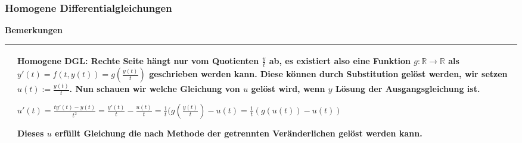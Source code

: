 \subsubsection{Homogene Differentialgleichungen}

    \noindent
    \textbf{Bemerkungen}
    \begin{table}[H]
    \begin{tabularx}{\textwidth}{X m{16cm}}
        \toprule

              & Homogene DGL: Rechte Seite hängt nur vom Quotienten $\frac{y}{t}$ ab, es existiert also eine Funktion $g: \mathbb{R} \rightarrow \mathbb{R}$
                als $y'(t) = f(t,y(t)) = g(\frac{y(t)}{t})$ geschrieben werden kann. \hfill \break
                Diese können durch Substitution gelöst werden, wir setzen $u(t) := \frac{y(t)}{t}$. \hfill \break
                Nun schauen wir welche Gleichung von $u$ gelöst wird, wenn $y$ Lösung der Ausgangsgleichung ist. \hfill \break
                \centerline{$ u'(t) = \frac{ty'(t)-y(t)}{t^2} = \frac{y'(t)}{t} - \frac{u(t)}{t} = \frac{1}{t} (g(\frac{y(t)}{t}) - u(t)
                = \frac{1}{t}(g(u(t))-u(t)) $} 
                Dieses $u$ erfüllt Gleichung die nach Methode der getrennten Veränderlichen gelöst werden kann.\\

        \bottomrule
    \end{tabularx}
    \end{table}

